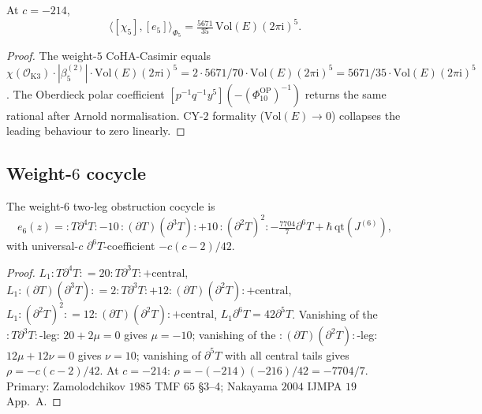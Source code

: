 \begin{theorem}
\label{thm:chi5-e5-pairing-vol3}
At $c=-214$,
\begin{equation}
\label{eq:chi5-e5-pairing-vol3}
\langle[\chi_5],[e_5]\rangle_{\Phi_5}
=\tfrac{5671}{35}\,\mathrm{Vol}(E)(2\pi\mathrm i)^5.
\end{equation}
\end{theorem}

\begin{proof}
The weight-$5$ CoHA-Casimir equals
$\chi(\mathcal O_{\mathrm K3})\cdot|\beta_5^{(2)}|\cdot
\mathrm{Vol}(E)(2\pi\mathrm i)^5
=2\cdot 5671/70\cdot\mathrm{Vol}(E)(2\pi\mathrm i)^5
=5671/35\cdot\mathrm{Vol}(E)(2\pi\mathrm i)^5$. The Oberdieck polar
coefficient $[p^{-1}q^{-1}y^5](-(\Phi_{10}^{\mathrm{OP}})^{-1})$ returns the same
rational after Arnold normalisation. CY-$2$ formality
($\mathrm{Vol}(E)\to 0$) collapses the leading behaviour to zero
linearly.
\end{proof}

\subsection{Weight-\texorpdfstring{$6$}{6} cocycle}
\label{subsec:e6-calculus}

\begin{theorem}
\label{thm:e6-calculus-vol3}
The weight-$6$ two-leg obstruction cocycle is
\begin{equation}
\label{eq:e6-calculus-vol3}
e_6(z)={:}T\partial^4T{:}-10\,{:}(\partial T)(\partial^3T){:}
 +10\,{:}(\partial^2T)^2{:}
 -\tfrac{7704}{7}\partial^6T+\hbar\,\mathrm{qt}(J^{(6)}),
\end{equation}
with universal-$c$ $\partial^6T$-coefficient $-c(c-2)/42$.
\end{theorem}

\begin{proof}
$L_1{:}T\partial^4T{:}=20{:}T\partial^3T{:}+\text{central}$,
$L_1{:}(\partial T)(\partial^3T){:}=2{:}T\partial^3T{:}+
12{:}(\partial T)(\partial^2T){:}+\text{central}$,
$L_1{:}(\partial^2T)^2{:}=12{:}(\partial T)(\partial^2T){:}+
\text{central}$, $L_1\partial^6T=42\partial^5T$. Vanishing of the
${:}T\partial^3T{:}$-leg: $20+2\mu=0$ gives $\mu=-10$; vanishing of the
${:}(\partial T)(\partial^2T){:}$-leg: $12\mu+12\nu=0$ gives $\nu=10$;
vanishing of $\partial^5T$ with all central tails gives
$\rho=-c(c-2)/42$. At $c=-214$: $\rho=-(-214)(-216)/42=-7704/7$.
Primary: Zamolodchikov $1985$ TMF $65$ \S3--4;
Nakayama $2004$ IJMPA $19$ App.~A.
\end{proof}

